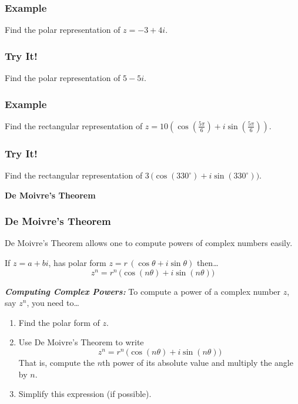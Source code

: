 \documentclass[12pt,xcolor={usenames,dvipsnames,x11names}]{beamer}
\begin{document}
\begin{frame}[t] \frametitle{Example}
{\small Find the polar representation of $z= -3 + 4i$.}
\end{frame}



\begin{frame}[t] \frametitle{Try It!}
{\small Find the polar representation of $5 - 5i$.}
\end{frame}



\begin{frame}[t] \frametitle{Example}
{\footnotesize Find the rectangular representation of $z= 10 \left( \cos \left(\tfrac{5\pi}{6} \right) + i \sin \left( \tfrac{5\pi}{6} \right) \right)$.}
\end{frame}



\begin{frame}[t] \frametitle{Try It!}
{\footnotesize Find the rectangular representation of $3 \,\big( \cos(330^\circ) + i \sin(330^\circ) \big)$.}
\end{frame}



\begin{frame}[t]
\phantom{.}\vfill \begin{center} \bfseries \LARGE \color{eblue} De Moivre's Theorem \end{center} \vfill
\end{frame}



\begin{frame}[t] \frametitle{De Moivre's Theorem}
\footnotesize De Moivre's Theorem allows one to compute powers of complex numbers easily.  

\begin{mythm}
\color{egold} If $z= a + bi$, has polar form $z= r \,(\cos \theta + i \sin \theta)$ then\dots
	\[
	z^n= r^n \, \big( \cos(n\theta) + i \sin(n \theta) \big)
	\]
\end{mythm} \par\vspace{0.3cm}

{\itshape \color{egreen} \bfseries Computing Complex Powers:} To compute a power of a complex number $z$, say $z^n$, you need to\dots
	\begin{enumerate}[1.]
	\item Find the polar form of $z$.
	\item Use De Moivre's Theorem to write 
		\[
		z^n= r^n \, \big( \cos(n\theta) + i \sin(n \theta) \big)
		\]
	That is, compute the $n$th power of its absolute value and multiply the angle by $n$.
	\item Simplify this expression (if possible).
	\end{enumerate}
\end{frame}
\end{document}
